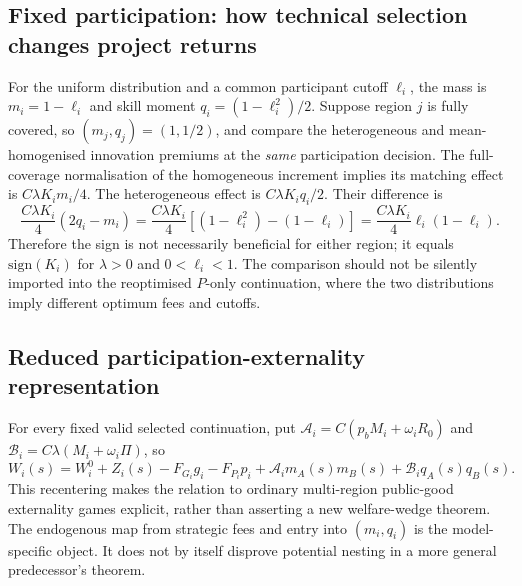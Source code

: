 \subsection{Fixed participation: how technical selection changes project returns}
For the uniform distribution and a common participant cutoff $\ell_i$, the mass is
$m_i=1-\ell_i$ and skill moment $q_i=(1-\ell_i^2)/2$. Suppose region $j$ is fully covered, so $(m_j,q_j)=(1,1/2)$, and compare the heterogeneous and mean-homogenised innovation premiums at the \emph{same} participation decision. The full-coverage normalisation of the homogeneous increment implies its matching effect is $C\lambda K_i m_i/4$. The heterogeneous effect is $C\lambda K_iq_i/2$. Their difference is
\begin{equation}
 \frac{C\lambda K_i}{4}(2q_i-m_i)
 =\frac{C\lambda K_i}{4}\left[(1-\ell_i^2)-(1-\ell_i)\right]
 =\frac{C\lambda K_i}{4}\ell_i(1-\ell_i).
\end{equation}
Therefore the sign is not necessarily beneficial for either region; it equals $\mathrm{sign}(K_i)$ for $\lambda>0$ and $0<\ell_i<1$. The comparison should not be silently imported into the reoptimised $P$-only continuation, where the two distributions imply different optimum fees and cutoffs.

\subsection{Reduced participation-externality representation}
For every fixed valid selected continuation, put
$\mathcal A_i=C(p_bM_i+\omega_iR_0)$ and $\mathcal B_i=C\lambda(M_i+\omega_i\Pi)$, so
\begin{equation}
 W_i(s)=W_i^0+Z_i(s)-F_{G_i}g_i-F_{P_i}p_i
       +\mathcal A_i m_A(s)m_B(s)
       +\mathcal B_iq_A(s)q_B(s).
\end{equation}
This recentering makes the relation to ordinary multi-region public-good externality games explicit, rather than asserting a new welfare-wedge theorem. The endogenous map from strategic fees and entry into $(m_i,q_i)$ is the model-specific object. It does not by itself disprove potential nesting in a more general predecessor's theorem.

